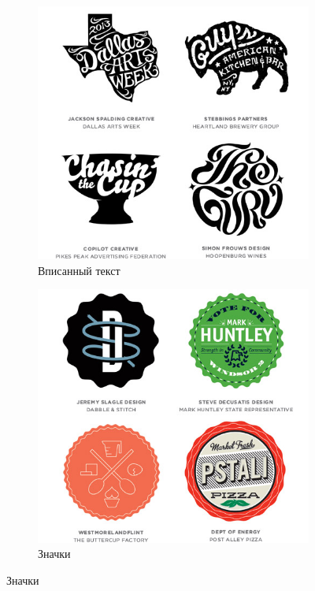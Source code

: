 \begin{figure}[h!]
  \ContinuedFloat
  \centering
  \begin{subfigure}{.45\textwidth}
    \centering
    \includegraphics[width=\linewidth]{images/supplement/logolounge/2013/Vpisannij-tekst}
    \caption[]{Вписанный текст}
    \label{fig:logolounge:2013:vpisannij-tekst}
  \end{subfigure}
  \hfill
  \centering
  \begin{subfigure}{.45\textwidth}
    \centering
    \includegraphics[width=\linewidth]{images/supplement/logolounge/2013/Znachki}
    \caption[]{Значки}
    \label{fig:logolounge:2013:znachki}
  \end{subfigure}


\end{figure}
